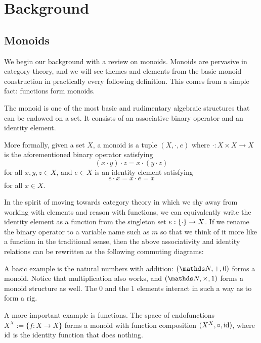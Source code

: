 \chapter{Background}

\section{Monoids}

We begin our background with a review on monoids.
Monoids are pervasive in category theory, and we will see themes and elements from the basic monoid construction in practically every following definition.
This comes from a simple fact: functions form monoids.

The monoid is one of the most basic and rudimentary algebraic structures that can be endowed on a set.
It consists of an associative binary operator and an identity element.

More formally, given a set $X$, a monoid is a tuple $(X,\cdot, e)$ where $\cdot:X\times X\rightarrow X$ is the aforementioned binary operator satisfying
\begin{equation}
	(x\cdot y)\cdot z = x\cdot(y\cdot z)
\end{equation}
for all $x,y,z\in X$,
and $e\in X$ is an identity element satisfying
\begin{equation}
	e\cdot x = x\cdot e = x
\end{equation}
for all $x\in X$.

In the spirit of moving towards category theory in which we shy away from working with elements and reason with functions, we can equivalently write the identity element as a function from the singleton set $e: \{\cdot\} \rightarrow X$.
If we rename the binary operator to a variable name such as $m$ so that we think of it more like a function in the traditional sense, then the above associativity and identity relations can be rewritten as the following commuting diagrams:

A basic example is the natural numbers with addition: $(\naturals, +, 0)$ forms a monoid.
Notice that multiplication also works, and $(\naturals, \times, 1)$ forms a monoid structure as well.
The $0$ and the $1$ elements interact in such a way as to form a rig.

A more important example is functions. The space of endofunctions $X^X := \{f:X\rightarrow X\}$ forms a monoid with function composition $(X^X, \circ, \mathrm{id})$, where $\mathrm{id}$ is the identity function that does nothing.

